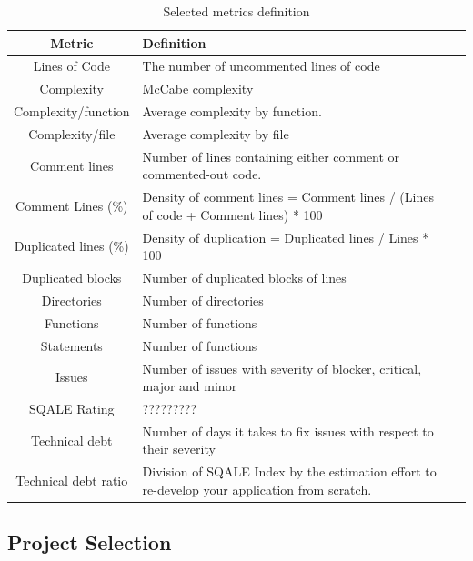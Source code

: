 \begin{table}[!hbt]
	\begin{center}
		\caption{Selected metrics definition}
		\label{tab:metrics_definition}
		\begin{tabular}{c| l l }
			\toprule
			\textbf{Metric} & \textbf{Definition} \\ \midrule
			Lines of Code & The number of uncommented lines of code    \\
			Complexity      & McCabe complexity    \\
			Complexity/function & Average complexity by function. \\
			Complexity/file & Average complexity by file \\
			Comment lines  & Number of lines containing either comment or commented-out code. \\
			Comment Lines (\%)   & Density of comment lines = Comment lines / (Lines of code + Comment lines) * 100    \\
			Duplicated lines (\%)     & Density of duplication = Duplicated lines / Lines * 100    \\
			Duplicated blocks   & Number of duplicated blocks of lines    \\
			Directories   & Number of directories    \\
			Functions            & Number of functions    \\
			Statements      & Number of functions   \\
			Issues    & Number of issues with severity of blocker, critical, major and minor   \\
		SQALE Rating   & ?????????    \\
			Technical debt    & Number of days it takes to fix issues with respect to their severity    \\
			Technical debt ratio   & Division of SQALE Index by the estimation effort to re-develop your application from scratch.    \\
		\end{tabular}
	\end{center}
\end{table}



\subsection{Project Selection}

